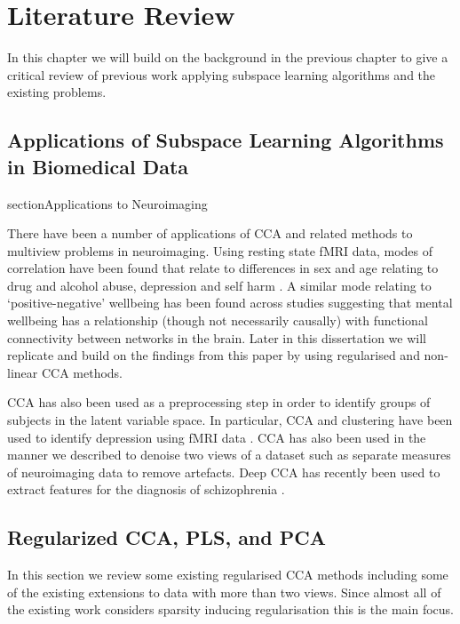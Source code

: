 \chapter{Literature Review}\label{Literature Review}

In this chapter we will build on the background in the previous chapter to give a critical review of previous work applying subspace learning algorithms and the existing problems.


\section{Applications of Subspace Learning Algorithms in Biomedical Data}
section{Applications to Neuroimaging}

There have been a number of applications of CCA and related methods to multiview problems in neuroimaging. Using resting state fMRI data, modes of correlation have been found that relate to differences in sex and age relating to drug and alcohol abuse, depression and self harm \cite{mihalik2019brain}. A similar mode relating to `positive-negative' wellbeing has been found across studies \cite{smith2015positive} suggesting that mental wellbeing has a relationship (though not necessarily causally) with functional connectivity between networks in the brain. Later in this dissertation we will replicate and build on the findings from this paper by using regularised and non-linear CCA methods.

CCA has also been used as a preprocessing step in order to identify groups of subjects in the latent variable space. In particular, CCA and clustering have been used to identify depression using fMRI data \cite{dinga2019evaluating} \cite{drysdale2017resting}. CCA has also been used in the manner we described to denoise two views of a dataset such as separate measures of neuroimaging data \cite{zhuang2020technical} to remove artefacts. Deep CCA has recently been used to extract features for the diagnosis of schizophrenia \cite{qi2016deep}.


\section{Regularized CCA, PLS, and PCA}
In this section we review some existing regularised CCA methods including some of the existing extensions to data with more than two views. Since almost all of the existing work considers sparsity inducing regularisation this is the main focus.

